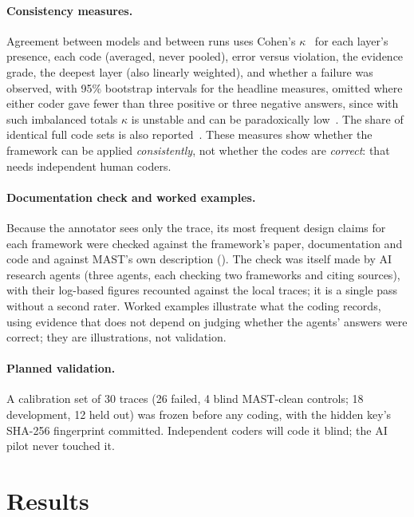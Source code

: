 \documentclass[11pt]{article}
\begin{document}
\paragraph{Consistency measures.} Agreement between models and between runs uses
Cohen's $\kappa$~\cite{cohen1960kappa,landis1977measurement} for each layer's
presence, each code (averaged, never pooled), error versus violation, the evidence
grade, the deepest layer (also linearly weighted), and whether a failure was
observed, with 95\% bootstrap intervals for the headline measures, omitted where
either coder gave fewer than three positive or three negative answers, since with
such imbalanced totals $\kappa$ is unstable and can be paradoxically
low~\cite{feinstein1990paradox}. The share of identical full code sets is
also reported~\cite{ahmadi2025hfacsgrpo}. These measures show whether the
framework can be applied \emph{consistently}, not whether the codes are
\emph{correct}: that needs independent human coders.

\paragraph{Documentation check and worked examples.} Because the annotator sees only the trace, its most frequent design claims for each framework were checked against the framework's paper, documentation and code and against MAST's own description (). The check was itself made by AI research agents (three agents, each checking two frameworks and citing sources), with their log-based figures recounted against the local traces; it is a single pass without a second rater. Worked examples illustrate what the
coding records, using evidence that does not depend on judging whether the agents'
answers were correct;
they are illustrations, not validation.

\paragraph{Planned validation.} A calibration set of 30 traces (26 failed, 4 blind
MAST-clean controls; 18 development, 12 held out) was frozen before any coding,
with the hidden key's SHA-256 fingerprint committed. Independent coders will code
it blind; the AI pilot never touched it.

\section{Results}
\label{sec:results}
\end{document}
